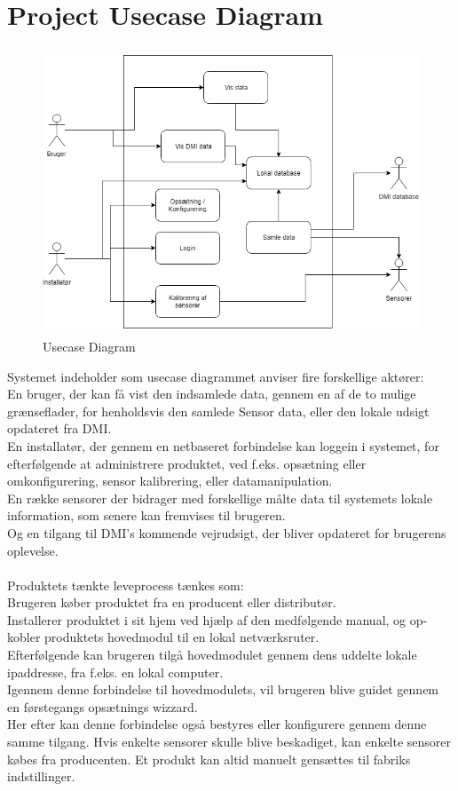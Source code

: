 \section{Project Usecase Diagram}
\begin{figure}[H]
    \centering
    \includegraphics[width=0.8\linewidth, height=8.5cm]{Struktureret_System_Udvikling/Workshop_1/Assets/IoT_weather_station.png}
    \caption{Usecase Diagram}
    \label{fig:my_label}
\end{figure}
Systemet indeholder som usecase diagrammet anviser fire forskellige aktører:\\
En bruger, der kan få vist den indsamlede data, gennem en af de to mulige grænseflader, for henholdsvis den samlede Sensor data, eller den lokale udsigt opdateret fra DMI.\\
En installatør, der gennem en netbaseret forbindelse kan loggein i systemet, for efterfølgende at administrere produktet, ved f.eks. opsætning eller omkonfigurering, sensor kalibrering, eller datamanipulation.\\
En række sensorer der bidrager med forskellige målte data til systemets lokale information, som senere kan fremvises til brugeren.\\
Og en tilgang til DMI's kommende vejrudsigt, der bliver opdateret for brugerens oplevelse.
\\\\
\noindent
Produktets tænkte leveprocess tænkes som:\\
Brugeren køber produktet fra en producent eller distributør.\\
Installerer produktet i sit hjem ved hjælp af den medfølgende manual, og op-kobler produktets hovedmodul til en lokal netværksruter.\\
Efterfølgende kan brugeren tilgå hovedmodulet gennem dens uddelte lokale ipaddresse, fra f.eks. en lokal computer.\\
Igennem denne forbindelse til hovedmodulets, vil brugeren blive guidet gennem en førstegangs opsætnings wizzard.\\
Her efter kan denne forbindelse også bestyres eller konfigurere gennem denne samme tilgang.
Hvis enkelte sensorer skulle blive beskadiget, kan enkelte sensorer købes fra producenten.
Et produkt kan altid manuelt gensættes til fabriks indstillinger.